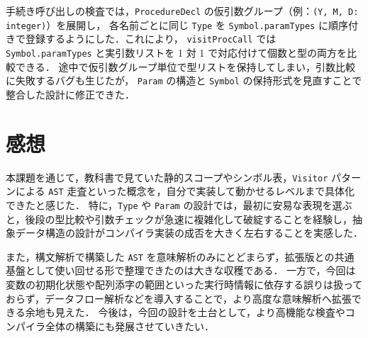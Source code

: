 \documentclass[a4j,10pt]{jarticle}
\begin{document}
手続き呼び出しの検査では，\verb|ProcedureDecl| の仮引数グループ（例：\verb|(Y, M, D: integer)|）を展開し，
各名前ごとに同じ \verb|Type| を \verb|Symbol.paramTypes| に順序付きで登録するようにした．これにより，
\verb|visitProcCall| では \verb|Symbol.paramTypes| と実引数リストを 1 対 1 で対応付けて個数と型の両方を比較できる．
途中で仮引数グループ単位で型リストを保持してしまい，引数比較に失敗するバグも生じたが，
\verb|Param| の構造と \verb|Symbol| の保持形式を見直すことで整合した設計に修正できた．

\section{感想}

本課題を通じて，教科書で見ていた静的スコープやシンボル表，\verb|Visitor| パターンによる \verb|AST| 走査といった概念を，自分で実装して動かせるレベルまで具体化できたと感じた．
特に，\verb|Type| や \verb|Param| の設計では，最初に安易な表現を選ぶと，後段の型比較や引数チェックが急速に複雑化して破綻することを経験し，抽象データ構造の設計がコンパイラ実装の成否を大きく左右することを実感した．

また，構文解析で構築した \verb|AST| を意味解析のみにとどまらず，拡張版との共通基盤として使い回せる形で整理できたのは大きな収穫である．
一方で，今回は変数の初期化状態や配列添字の範囲といった実行時情報に依存する誤りは扱っておらず，データフロー解析などを導入することで，より高度な意味解析へ拡張できる余地も見えた．
今後は，今回の設計を土台として，より高機能な検査やコンパイラ全体の構築にも発展させていきたい．
\end{document}
